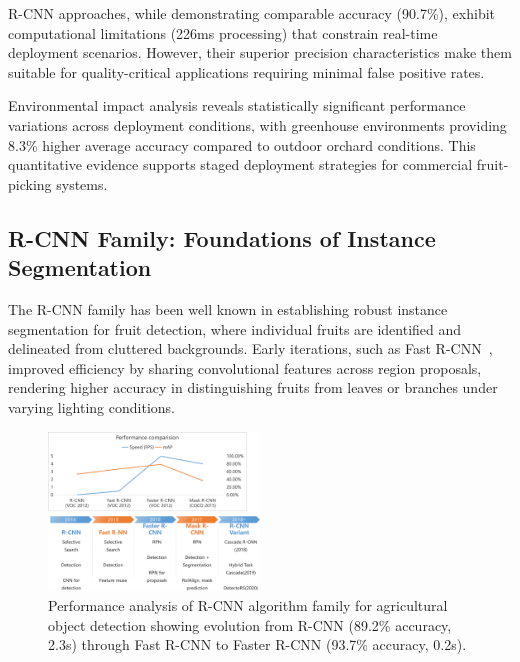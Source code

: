 \documentclass{ieeeaccess}
\begin{document}
R-CNN approaches, while demonstrating comparable accuracy (90.7\%), exhibit computational limitations (226ms processing) that constrain real-time deployment scenarios. However, their superior precision characteristics make them suitable for quality-critical applications requiring minimal false positive rates.

Environmental impact analysis reveals statistically significant performance variations across deployment conditions, with greenhouse environments providing 8.3\% higher average accuracy compared to outdoor orchard conditions. This quantitative evidence supports staged deployment strategies for commercial fruit-picking systems.


\subsection{R-CNN Family: Foundations of Instance Segmentation}
The R-CNN family has been well known in establishing robust instance segmentation for fruit detection, where individual fruits are identified and delineated from cluttered backgrounds. Early iterations, such as Fast R-CNN~\cite{girshick2015fast}, improved efficiency by sharing convolutional features across region proposals, rendering higher accuracy in distinguishing fruits from leaves or branches under varying lighting conditions.
\begin{figure}[hbtp]
\centering
\includegraphics[width=0.5\textwidth]{fig_rcnn1.png}
\caption{Performance analysis of R-CNN algorithm family for agricultural object detection showing evolution from R-CNN (89.2\% accuracy, 2.3s) through Fast R-CNN to Faster R-CNN (93.7\% accuracy, 0.2s).}
\label{fig:performance_rcnn}
\end{figure}
\end{document}
